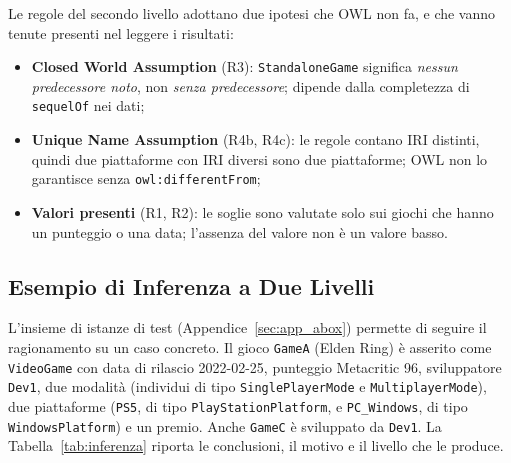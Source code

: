 Le regole del secondo livello adottano due ipotesi che OWL non fa, e che vanno tenute presenti nel leggere
i risultati:
\begin{itemize}[nosep]
  \item \textbf{Closed World Assumption} (R3): \texttt{StandaloneGame} significa \emph{nessun predecessore
    noto}, non \emph{senza predecessore}; dipende dalla completezza di \texttt{sequelOf} nei dati;
  \item \textbf{Unique Name Assumption} (R4b, R4c): le regole contano IRI distinti, quindi due piattaforme
    con IRI diversi sono due piattaforme; OWL non lo garantisce senza \texttt{owl:differentFrom};
  \item \textbf{Valori presenti} (R1, R2): le soglie sono valutate solo sui giochi che hanno un punteggio o
    una data; l'assenza del valore non \`e un valore basso.
\end{itemize}

\subsection{Esempio di Inferenza a Due Livelli}

L'insieme di istanze di test (Appendice~\ref{sec:app_abox}) permette di seguire il
ragionamento su un caso concreto. Il gioco \texttt{GameA} (Elden Ring) \`e asserito
come \texttt{VideoGame} con data di rilascio 2022-02-25, punteggio Metacritic 96,
sviluppatore \texttt{Dev1}, due modalit\`a (individui di tipo \texttt{SinglePlayerMode}
e \texttt{MultiplayerMode}), due piattaforme (\texttt{PS5}, di tipo
\texttt{PlayStationPlatform}, e \texttt{PC\_Windows}, di tipo \texttt{WindowsPlatform})
e un premio. Anche \texttt{GameC} \`e sviluppato da \texttt{Dev1}.
La Tabella~\ref{tab:inferenza} riporta le conclusioni, il motivo e il livello che le produce.


